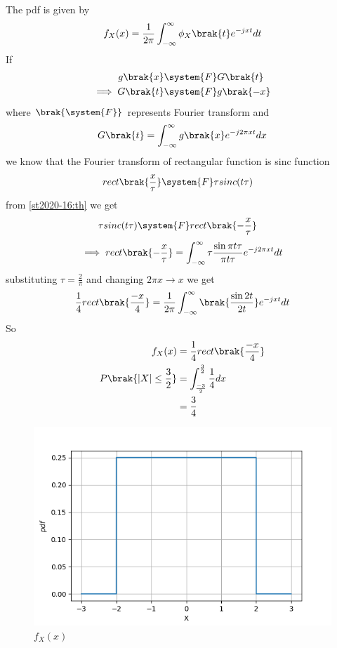 
The pdf is given by
\begin{align}
    f_{X}(x) = \frac{1}{2\pi} \int_{-\infty}^{\infty}  \phi_{X}\brak{t}e^{-jxt} dt 
\end{align}
If
\begin{align}
    g\brak{x} &\system{F} G\brak{t}\\
    \implies G\brak{t} &\system{F} g\brak{-x} \label{st2020-16:th}
\end{align}
where $ \brak{\system{F}}$ represents Fourier transform and
\begin{align}
    G\brak{t}  = \int_{-\infty}^{\infty} g\brak{x} e^{-j2\pi xt} dx 
\end{align}
we know that the Fourier transform of rectangular function is sinc function
\begin{align}
    rect\brak{\frac{x}{\tau}} &\system{F} \tau sinc(t\tau)
\end{align}
from \eqref{st2020-16:th} we get
\begin{align}
  \tau sinc(t\tau) &\system{F} rect\brak{-\frac{x}{\tau}}
\end{align}
\begin{align}
 \implies rect\brak{-\frac{x}{\tau}} = \int_{-\infty}^{\infty} \tau \frac{\sin{\pi t \tau}}{{\pi t \tau}} e^{-j2\pi xt}dt
\end{align}
substituting $\tau = \frac{2}{\pi}$ and changing $2\pi x \rightarrow x $ we get
\begin{align}
    \frac{1}{4}rect\brak{\frac{-x}{4}} = \frac{1}{2\pi} \int_{-\infty}^{\infty} \brak {\frac{\sin{2t}}{2t}}e^{-jxt} dt 
\end{align}
So
\begin{align}
    f_{X}(x) &= \frac{1}{4}rect\brak{\frac{-x}{4}}\\
    P\brak{|X|\leq \frac{3}{2}} &= \int_{\frac{-3}{2}}^{\frac{3}{2}} \frac{1}{4} dx\\
    &=\frac{3}{4}
\end{align}
\begin{figure}[!ht]
\centering
\includegraphics[width=\columnwidth]{solutions/st/2020/16/figs/Assignment5.png}
\caption{$f_{X}(x)$}
\label{st2020-16:pdf}
\end{figure}


